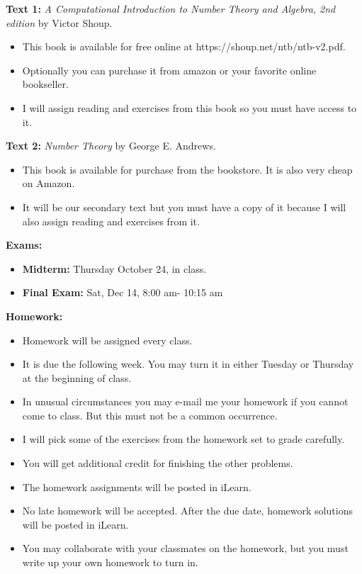 \documentclass[oneside,12pt]{amsart}
\begin{document}
\bigskip
\textbf{Text 1:} \emph{A Computational Introduction to Number Theory and Algebra, 2nd edition} by Victor Shoup.
\begin{itemize}
\item This book is available for free online at https://shoup.net/ntb/ntb-v2.pdf.
\item Optionally you can purchase it from amazon or your favorite online bookseller.
\item I will assign reading and exercises from this book so you must have access to it.
\end{itemize}


\bigskip

\textbf{Text 2:} \emph{Number Theory} by George E. Andrews.
\begin{itemize}
\item This book is available for purchase from the bookstore. It is also very cheap on Amazon.
\item It will be our secondary text but you must have a copy of it because I will also assign reading and exercises from it.
\end{itemize}

\bigskip

\textbf{Exams:}
\begin{itemize}
\item \textbf{Midterm:} Thursday October 24, in class.
\item \textbf{Final Exam:} Sat, Dec 14, 8:00 am- 10:15 am
\end{itemize}

\bigskip

\textbf{Homework:}
\begin{itemize}
\item Homework will be assigned every class.
\item It is due the following week. You may turn it in either Tuesday or Thursday at the beginning of class.
\item In unusual circumstances you may e-mail me your homework if you cannot come to class. But this must not be a common occurrence.
\item I will pick some of the exercises from the homework set to grade carefully.
\item You will get additional credit for finishing the other problems.
\item The homework assignments will be posted in iLearn.
\item No late homework will be accepted. After the due date, homework solutions will be posted in iLearn.
\item You may collaborate with your classmates on the homework, but you must write up your own homework to turn in.
\end{itemize}
\end{document}
